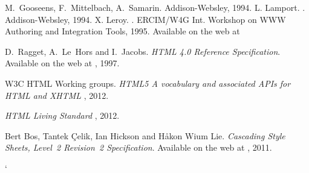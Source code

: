 \begin{thebibliography}{xxxxxxxxxx}
M.~Gooseens, F.~Mittelbach, A.~Samarin.
\newblock Addison-Websley, 1994.
L. Lamport.
.
\newblock Addison-Websley, 1994.
X. Leroy.
.
\newblock ERCIM/W4G Int. Workshop on WWW Authoring and Integration
Tools, 1995.
\newblock Available on the web at

D.~Ragget, A.~Le~Hors and I.~Jacobs.
{\em HTML 4.0 Reference Specification}. Available on the web at
, 1997.

W3C HTML Working groups.
{\em HTML5 A vocabulary and associated APIs for HTML and XHTML}
, 2012.


{\em HTML Living Standard}
,
2012.

Bert Bos,
Tantek \c{C}elik,
Ian Hickson
and
H{\aa}kon Wium Lie.
{\em Cascading Style Sheets, Level~2 Revision~2 Specification}. Available on
the web at
, 2011.
\end{thebibliography}

\printindex
\cutend\cutend

`
